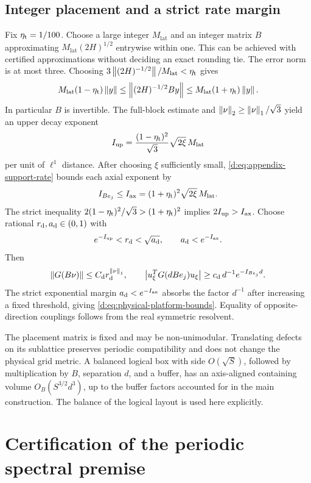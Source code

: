 \subsection{Integer placement and a strict rate margin}

Fix \(\eta_{\rm t}=1/100\). Choose a large integer \(M_{\mathrm{lat}}\) and
an integer matrix \(B\) approximating \(M_{\mathrm{lat}}(2H)^{1/2}\)
entrywise within one. This can be achieved with certified approximations
without deciding an exact rounding tie. The error norm is at most three.
Choosing \(3\left\lVert (2H)^{-1/2}\right\rVert/M_{\mathrm{lat}}<\eta_{\rm t}\) gives
\[
 M_{\mathrm{lat}}(1-\eta_{\rm t})\left\lVert y\right\rVert
 \le\left\lVert (2H)^{-1/2}By\right\rVert
 \le M_{\mathrm{lat}}(1+\eta_{\rm t})\left\lVert y\right\rVert.
\]
In particular \(B\) is invertible. The full-block estimate and
\(\left\lVert \nu\right\rVert_2\ge\left\lVert \nu\right\rVert_1/\sqrt3\) yield an upper decay exponent
\[
 I_{\rm up}=\frac{(1-\eta_{\rm t})^2}{\sqrt3}\sqrt{2\xi}\,M_{\mathrm{lat}}
\]
per unit of \(\ell^1\) distance. After choosing \(\xi\) sufficiently small,
\eqref{d:eq:appendix-support-rate} bounds each axial exponent by
\[
 I_{Be_j}\le I_{\rm ax}=(1+\eta_{\rm t})^2\sqrt{2\xi}\,M_{\mathrm{lat}}.
\]
The strict inequality
\(2(1-\eta_{\rm t})^2/\sqrt3>(1+\eta_{\rm t})^2\) implies \(2I_{\rm up}>I_{\rm ax}\).
Choose rational \(r_{\rm d},a_{\rm d}\in(0,1)\) with
\[
 e^{-I_{\rm up}}<r_{\rm d}<\sqrt{a_{\rm d}},\qquad a_{\rm d}<e^{-I_{\rm ax}}.
\]
Then
\[
 \left\lVert G(B\nu)\right\rVert\le C_{\rm d}r_{\rm d}^{\left\lVert \nu\right\rVert_1},\qquad
 \left\lvert u_\xi^TG(dBe_j)u_\xi\right\rvert\ge c_{\rm d}\,d^{-1}e^{-I_{Be_j}d}.
\]
The strict exponential margin \(a_{\rm d}<e^{-I_{\rm ax}}\) absorbs the factor \(d^{-1}\)
after increasing a fixed threshold, giving
\eqref{d:eq:physical-platform-bounds}. Equality of opposite-direction
couplings follows from the real symmetric resolvent.

The placement matrix is fixed and may be non-unimodular. Translating
defects on its sublattice preserves periodic compatibility and does not
change the physical grid metric. A balanced logical box with side
\(O(\sqrt S)\), followed by multiplication by \(B\), separation \(d\),
and a buffer, has an axis-aligned containing volume
\(O_B(S^{3/2}d^3)\), up to the buffer factors accounted for in the main
construction. The balance of the logical layout is used here explicitly.


\section{Certification of the periodic spectral premise}
\label{d:app:certificate}

